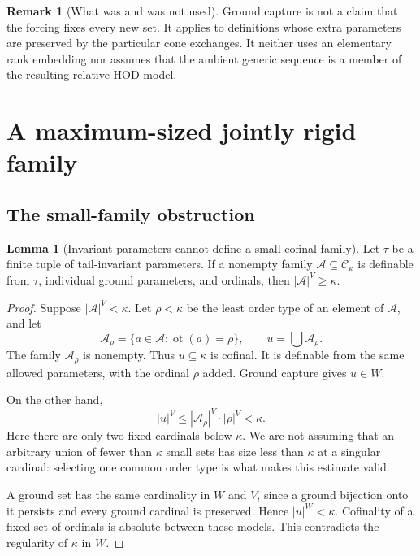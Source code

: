 \documentclass[11pt,letterpaper]{article}
\theoremstyle{definition}
\newtheorem{lemma}[definition]{Lemma}
\newtheorem{remark}[definition]{Remark}
\numberwithin{equation}{section}
\newcommand{\ot}{\operatorname{ot}}
\newcommand{\Ck}{\mathcal C_\kappa}
\begin{document}
\begin{remark}[What was and was not used]
Ground capture is not a claim that the forcing fixes every new set. It applies to definitions whose extra parameters are preserved by the particular cone exchanges. It neither uses an elementary rank embedding nor assumes that the ambient generic sequence is a member of the resulting relative-HOD model.
\end{remark}

\section{A maximum-sized jointly rigid family}\label{sec:maximal}

\subsection{The small-family obstruction}

\begin{lemma}[Invariant parameters cannot define a small cofinal family]\label{lem:small}
Let $\tau$ be a finite tuple of tail-invariant parameters. If a nonempty family $\mathcal A\subseteq\Ck$ is definable from $\tau$, individual ground parameters, and ordinals, then $|\mathcal A|^V\geq\kappa$.
\end{lemma}
\begin{proof}
Suppose $|\mathcal A|^V<\kappa$. Let $\rho<\kappa$ be the least order type of an element of $\mathcal A$, and let
\[
 \mathcal A_\rho=\{a\in\mathcal A:\ot(a)=\rho\},\qquad
 u=\bigcup\mathcal A_\rho.
\]
The family $\mathcal A_\rho$ is nonempty. Thus $u\subseteq\kappa$ is cofinal. It is definable from the same allowed parameters, with the ordinal $\rho$ added. Ground capture gives $u\in W$.

On the other hand,
\[
 |u|^V\leq |\mathcal A_\rho|^V\cdot|\rho|^V<\kappa.
\]
Here there are only two fixed cardinals below $\kappa$. We are not assuming that an arbitrary union of fewer than $\kappa$ small sets has size less than $\kappa$ at a singular cardinal: selecting one common order type is what makes this estimate valid.

A ground set has the same cardinality in $W$ and $V$, since a ground bijection onto it persists and every ground cardinal is preserved. Hence $|u|^W<\kappa$. Cofinality of a fixed set of ordinals is absolute between these models. This contradicts the regularity of $\kappa$ in $W$.
\end{proof}
\end{document}
